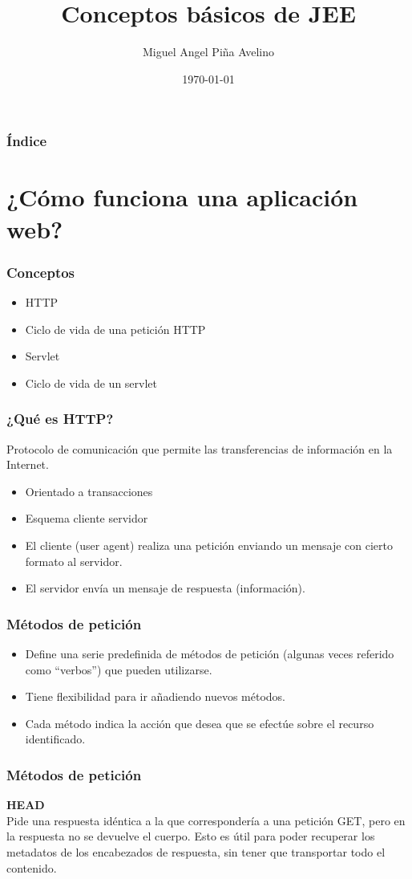 \documentclass{beamer}
\title[Laboratorio]{Conceptos básicos de JEE}
\author[Miguel]{Miguel Angel Piña Avelino}
\institute[UNAM]{
  Ingeniería de Software,\\
  Facultad de Ciencias, UNAM
}
\date{\today}
\begin{document}
\frame{\titlepage}
\begin{frame}
  \frametitle{Índice}
  \tableofcontents
\end{frame}

\section{¿Cómo funciona una aplicación web?}

\begin{frame}
  \frametitle{Conceptos}
  \begin{itemize}[<+->]
  \item HTTP
  \item Ciclo de vida de una petición HTTP
  \item Servlet
  \item Ciclo de vida de un servlet
  \end{itemize}
\end{frame}

\begin{frame}
  \frametitle{¿Qué es HTTP?}
  Protocolo de comunicación que permite las transferencias de
  información en la Internet.
  \begin{itemize}[<+->]
  \item Orientado a transacciones
  \item Esquema cliente servidor
  \item El cliente (user agent) realiza una petición enviando un
    mensaje con cierto formato al servidor.
  \item El servidor envía un mensaje de respuesta (información).
  \end{itemize}
\end{frame}

\begin{frame}
  \frametitle{Métodos de petición}
  \begin{itemize}[<+->]
    \item Define una serie predefinida de métodos de petición (algunas
      veces referido como ``verbos'') que pueden utilizarse.
    \item Tiene flexibilidad para ir añadiendo nuevos métodos.
    \item Cada método indica la acción que desea que se efectúe sobre el recurso
      identificado.
  \end{itemize}
\end{frame}

\begin{frame}
  \frametitle{Métodos de petición}
  \textbf{HEAD}\\
  Pide una respuesta idéntica a la que correspondería a una petición
  GET, pero en la respuesta no se devuelve el cuerpo. Esto es útil
  para poder recuperar los metadatos de los encabezados de respuesta,
  sin tener que transportar todo el contenido.
\end{frame}
\end{document}
